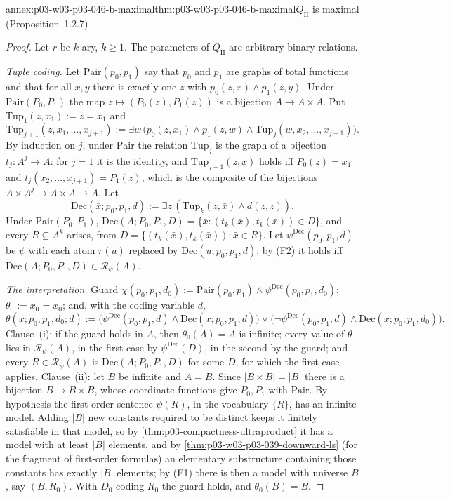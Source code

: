 \begin{annexitem}{annex:p03-w03-p03-046-b-maximal}{thm:p03-w03-p03-046-b-maximal}{\(Q_{\mathrm{II}}\) is maximal (Proposition~1.2.7)}
\begin{proof}
Let \(r\) be \(k\)-ary, \(k\ge1\). The parameters of \(Q_{\mathrm{II}}\)
are arbitrary binary relations.

\emph{Tuple coding.} Let \(\mathrm{Pair}(p_0,p_1)\) say that \(p_0\) and
\(p_1\) are graphs of total functions and that for all \(x,y\) there is
exactly one \(z\) with \(p_0(z,x)\wedge p_1(z,y)\). Under
\(\mathrm{Pair}(P_0,P_1)\) the map \(z\mapsto(P_0(z),P_1(z))\) is a
bijection \(A\to A\times A\). Put \(\mathrm{Tup}_1(z,x_1):=z=x_1\) and
\[
\mathrm{Tup}_{j+1}(z,x_1,\dots,x_{j+1}):=\exists
w\,\bigl(p_0(z,x_1)\wedge p_1(z,w)\wedge\mathrm{Tup}_j(w,x_2,\dots,x_{j+1})\bigr).
\]
By induction on \(j\), under \(\mathrm{Pair}\) the relation
\(\mathrm{Tup}_j\) is the graph of a bijection \(t_j\colon A^j\to A\): for
\(j=1\) it is the identity, and \(\mathrm{Tup}_{j+1}(z,\bar x)\) holds iff
\(P_0(z)=x_1\) and \(t_j(x_2,\dots,x_{j+1})=P_1(z)\), which is the
composite of the bijections \(A\times A^j\to A\times A\to A\). Let
\[
\mathrm{Dec}(\bar x;p_0,p_1,d):=\exists z\,(\mathrm{Tup}_k(z,\bar x)\wedge
d(z,z)).
\]
Under \(\mathrm{Pair}(P_0,P_1)\), \(\mathrm{Dec}(A;P_0,P_1,D)=\{\bar
x:(t_k(\bar x),t_k(\bar x))\in D\}\), and every \(R\subseteq A^k\) arises,
from \(D=\{(t_k(\bar x),t_k(\bar x)):\bar x\in R\}\). Let
\(\psi^{\mathrm{Dec}}(p_0,p_1,d)\) be \(\psi\) with each atom \(r(\bar u)\)
replaced by \(\mathrm{Dec}(\bar u;p_0,p_1,d)\); by (F2) it holds iff
\(\mathrm{Dec}(A;P_0,P_1,D)\in\mathscr R_\psi(A)\).

\emph{The interpretation.} Guard
\(\chi(p_0,p_1,d_0):=\mathrm{Pair}(p_0,p_1)\wedge\psi^{\mathrm{Dec}}(p_0,p_1,d_0)\);
\(\theta_0:=x_0=x_0\); and, with the coding variable \(d\),
\[
\theta(\bar x;p_0,p_1,d_0;d):=\bigl(\psi^{\mathrm{Dec}}(p_0,p_1,d)\wedge
\mathrm{Dec}(\bar x;p_0,p_1,d)\bigr)\vee\bigl(\neg\psi^{\mathrm{Dec}}(p_0,p_1,d)
\wedge\mathrm{Dec}(\bar x;p_0,p_1,d_0)\bigr).
\]
Clause~(i): if the guard holds in \(A\), then \(\theta_0(A)=A\) is
infinite; every value of \(\theta\) lies in \(\mathscr R_\psi(A)\), in the
first case by \(\psi^{\mathrm{Dec}}(D)\), in the second by the guard; and
every \(R\in\mathscr R_\psi(A)\) is \(\mathrm{Dec}(A;P_0,P_1,D)\) for some
\(D\), for which the first case applies. Clause~(ii): let \(B\) be
infinite and \(A=B\). Since \(|B\times B|=|B|\) there is a bijection
\(B\to B\times B\), whose coordinate functions give \(P_0,P_1\) with
\(\mathrm{Pair}\). By hypothesis the first-order sentence \(\psi(R)\), in
the vocabulary \(\{R\}\), has an infinite model. Adding \(|B|\) new
constants required to be distinct keeps it finitely satisfiable in that
model, so by \cref{thm:p03-compactness-ultraproduct} it has a model with at
least \(|B|\) elements, and by \cref{thm:p03-w03-p03-039-downward-ls}
(for the fragment of first-order formulas) an elementary substructure
containing those constants has exactly \(|B|\) elements; by (F1) there is
then a model with universe \(B\), say \((B,R_0)\). With
\(D_0\) coding \(R_0\) the guard holds, and \(\theta_0(B)=B\).
\end{proof}
\end{annexitem}

